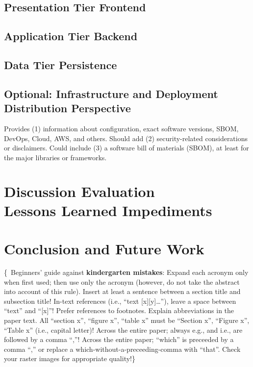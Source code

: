 \documentclass[conference,a4paper,flushend]{cs-techrep} %
\begin{document}
\subsection{Presentation Tier \textbar{} Frontend}
\lipsum[3]

\subsection{Application Tier \textbar{} Backend \textbar{} }
\lipsum[4]

\subsection{Data Tier \textbar{} Persistence}
\lipsum[5]

\subsection{Optional: Infrastructure and Deployment \textbar{} Distribution Perspective \textbar{} }
Provides (1) information about configuration, exact software versions, SBOM, DevOps, Cloud, AWS, and others.
Should add (2) security-related considerations or disclaimers.
Could include (3) a software bill of materials (SBOM), at least for the major libraries or frameworks.


\section{Discussion \textbar{} Evaluation \textbar{} \\ Lessons Learned \textbar{} Impediments}
\lipsum[6]

\section{Conclusion and Future Work \textbar{} \\ }
\lipsum[7]

\vspace{\baselineskip}
\{\,\faWarning{} Beginners' guide against \textbf{kindergarten mistakes}:
Expand each acronym only when first used; then use only the acronym (however, do not take the abstract into account of this rule).
Insert at least a sentence between a section title and subsection title!
In-text references (i.e., \enquote{text [x][y]\ldots{}}), leave a space between \enquote{text} and \enquote{[x]}!
Prefer references to footnotes.
Explain abbreviations in the paper text.
All \enquote{section x}, \enquote{figure x}, \enquote{table x} must be \enquote{Section x}, \enquote{Figure x}, \enquote{Table x} (i.e., capital letter)!
Across the entire paper; always e.g., and i.e., are followed by a comma \enquote{,}!
Across the entire paper; \enquote{which} is preceeded by a comma \enquote{,} or replace a which-without-a-preceeding-comma with \enquote{that}.
Check your raster images for appropriate quality!\}
\end{document}
